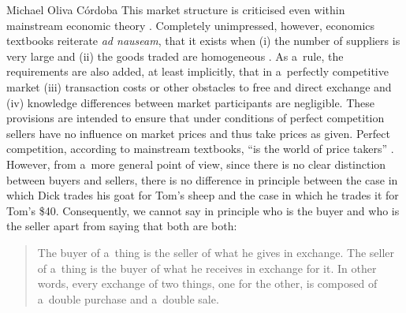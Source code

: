 \begin{artengenv}{Michael Oliva Córdoba}
This market structure is criticised even within mainstream economic theory 
\parencites[cf., e.g.,][]{ackerman_flawed_2004}[][]{petri_general_2003}. %
 Completely unimpressed, however, economics textbooks reiterate \textit{ad nauseam}, that it exists when (i) the number of suppliers is very large and (ii) the goods traded are homogeneous 
\parencite[see, e.g.,][p.62]{mankiw_principles_2020}. %
 As a~rule, the requirements are also added, at least implicitly, that in a~perfectly competitive market (iii) transaction costs or other obstacles to free and direct exchange and (iv) knowledge differences between market participants are negligible. These provisions are intended to ensure that under conditions of perfect competition sellers have no influence on market prices and thus take prices as given. Perfect competition, according to mainstream textbooks, ``is the world of price takers'' 
\parencite[][p.150]{samuelson_economics_2009}. %
 However, from a~more general point of view, since there is no clear distinction between buyers and sellers, there is no difference in principle between the case in which Dick trades his goat for Tom's sheep and the case in which he trades it for Tom's \$40. Consequently, we cannot say in principle who is the buyer and who is the seller apart from saying that both are both:



\begin{quote}
The buyer of a~thing is the seller of what he gives in exchange. The seller of a~thing is the buyer of what he receives in exchange for it. In other words, every exchange of two things, one for the other, is composed of a~double purchase and a~double sale. 
\parencite[p.42\ \mbox{[orig.~1896]}]{walras_lewalras_2019}%
\end{quote}





\end{artengenv}
